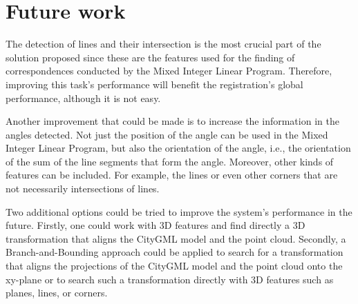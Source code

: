     
    
    \section{Future work}
        The detection of lines and their intersection is the most crucial part of the solution proposed 
        since these are the features used for the finding of correspondences conducted by the Mixed Integer Linear Program. 
        Therefore, improving this task’s performance will benefit the registration’s global performance, although it is not easy.

        Another improvement that could be made is to increase the information in the angles detected. 
        Not just the position of the angle can be used in the Mixed Integer Linear Program, but also the orientation of the angle, 
        i.e., the orientation of the sum of the line segments that form the angle.
        Moreover, other kinds of features can be included. For example, the lines or even other corners that are not necessarily intersections of lines.

        Two additional options could be tried to improve the system’s performance in the future. 
        Firstly, one could work with 3D features and find directly a 3D transformation that aligns the CityGML model and the point cloud. 
        Secondly, a Branch-and-Bounding approach \cite{Bazin_2013_abranchandbound,Breuel_2003_implementation,Brown_2015_globally,Brown_2019_afamily} 
        could be applied to search for a transformation that aligns the projections of the CityGML model and the point cloud onto the xy-plane 
        or to search such a transformation directly with 3D features such as planes, lines, or corners.  


